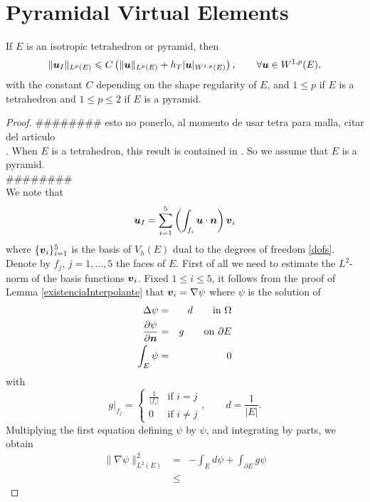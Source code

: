 \section{Pyramidal Virtual Elements}

\begin{theorem}
If $E$ is an isotropic tetrahedron or pyramid, then  
\begin{equation}\label{estab2}
\|\boldsymbol{u}_I\|_{L^p(E)}\leqslant C\left(\|\boldsymbol{u}\|_{L^p(E)}+ h_T|\boldsymbol{u}|_{W^{1,p}(E)}\right), \qquad \forall \boldsymbol{u}\in W^{1,p}(E),
\end{equation}
with the constant $C$ depending on the shape regularity of $E$, and $1\leqslant p$ if $E$ is a tetrahedron and $1\leqslant p\leqslant 2$ if $E$ is a pyramid.
\end{theorem}
\begin{proof}
{\color{blue}\#\#\#\#\#\#\#\# esto no ponerlo, al momento de usar tetra para
malla, citar del articulo\\.}
When $E$ is a tetrahedron, this result is contained in \cite{aadl}. So we assume that $E$ is a pyramid.\\ 
{\color{blue}\#\#\#\#\#\#\#\#\\}
We note that 
\begin{equation}\label{estab2:eq1}
\boldsymbol{u}_I=\sum_{i=1}^5 \left(\int_{f_i}\boldsymbol{u}\cdot \boldsymbol{n}\right)\boldsymbol{v}_i
\end{equation}
where $\{\boldsymbol{v}_i\}_{i=1}^5$ is the basis of $V_h(E)$ dual to the degrees of freedom
\ref{dofs}. Denote by $f_j$, $j=1,\ldots,5$ the faces of $E$. First of all we need to estimate the $L^2$-norm of the basis functions $\boldsymbol{v}_i$. Fixed $1\leqslant i\leqslant 5$, it follows from the proof of Lemma \ref{existenciaInterpolante} that $\boldsymbol{v}_i=\nabla \psi$ where $\psi$ is the solution of
\begin{eqnarray*}
\Delta\psi&=&d\qquad\mbox{in }\Omega\\ \frac{\partial\psi}{\partial\boldsymbol{n}}&=&g\qquad\mbox{on }\partial E\\ \int_E\psi&=&0
\end{eqnarray*}
with
\[
g|_{f_j}=\left\{\begin{array}{cl}\frac1{|f_i|}&\mbox{if }i=j\\0&\mbox{if }i\ne j\end{array}\right., \qquad d=\frac1{|E|}.
\]
Multiplying the first equation defining $\psi$ by $\psi$, and integrating by parts, we obtain
\begin{eqnarray*}
\|\nabla\psi\|_{L^2(E)}^2 &=& -\int_Ed\psi + \int_{\partial E}g\psi\\ &\leqslant & 

\end{eqnarray*}
\end{proof}

